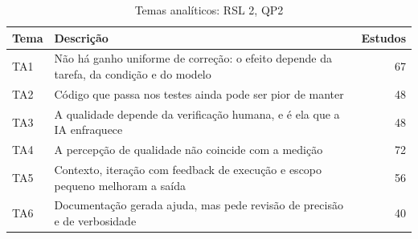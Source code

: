 \begin{table}[htbp]
\centering
\caption{Temas analíticos: RSL 2, QP2}
\label{tab:temas-B2}
\small
\begin{tabular}{lp{11cm}r}
\hline
\textbf{Tema} & \textbf{Descrição} & \textbf{Estudos} \\
\hline
TA1 & Não há ganho uniforme de correção: o efeito depende da tarefa, da condição e do modelo & 67 \\
TA2 & Código que passa nos testes ainda pode ser pior de manter & 48 \\
TA3 & A qualidade depende da verificação humana, e é ela que a IA enfraquece & 48 \\
TA4 & A percepção de qualidade não coincide com a medição & 72 \\
TA5 & Contexto, iteração com feedback de execução e escopo pequeno melhoram a saída & 56 \\
TA6 & Documentação gerada ajuda, mas pede revisão de precisão e de verbosidade & 40 \\
\hline
\end{tabular}
\end{table}
